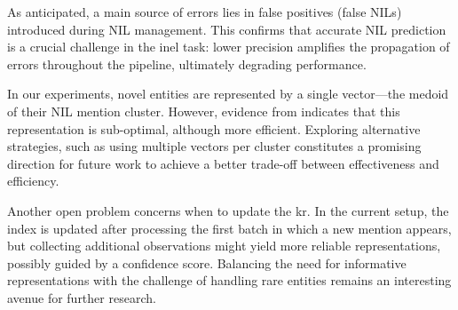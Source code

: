 As anticipated, a main source of errors lies in false positives (false NILs) introduced during NIL management. This confirms that accurate NIL prediction is a crucial challenge in the \ac{inel} task: lower precision amplifies the propagation of errors throughout the pipeline, ultimately degrading performance.


In our experiments, novel entities are represented by a single vector---the medoid of their NIL mention cluster. However, evidence from  indicates that this representation is sub-optimal, although more efficient. Exploring alternative strategies, such as using multiple vectors per cluster constitutes a promising direction for future work to achieve a better trade-off between effectiveness and efficiency.

Another open problem concerns when to update the \ac{kr}. In the current setup, the index is updated after processing the first batch in which a new mention appears, but collecting additional observations might yield more reliable representations, possibly guided by a confidence score.
Balancing the need for informative representations with the challenge of handling rare entities remains an interesting avenue for further research.




\clearpage